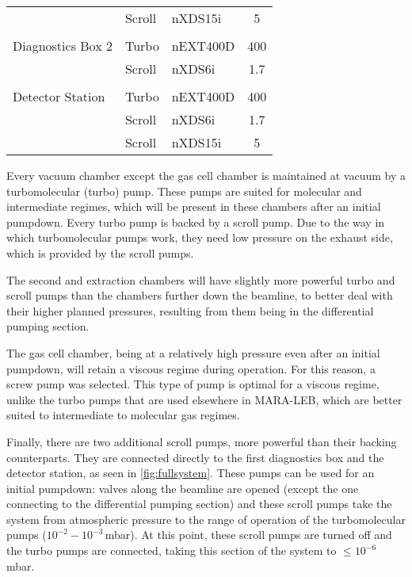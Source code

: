 \begin{table}[h!]
\begin{tabular}{@{}lllc@{}}
                        & Scroll    & nXDS15i       & 5     \\
                                                            \\
    Diagnostics Box 2   & Turbo     & nEXT400D      & 400   \\
                        & Scroll    & nXDS6i        & 1.7   \\
                                                            \\
    Detector Station    & Turbo     & nEXT400D      & 400   \\
                        & Scroll    & nXDS6i        & 1.7   \\
                        & Scroll    & nXDS15i       & 5     \\
    \hline
    \end{tabular}
 \end{table}

Every vacuum chamber except the gas cell chamber is maintained at vacuum by a turbomolecular (turbo) pump. These pumps are suited for molecular and intermediate regimes, which will be present in these chambers after an initial pumpdown. Every turbo pump is backed by a scroll pump. Due to the way in which turbomolecular pumps work, they need low pressure on the exhaust side, which is provided by the scroll pumps.

The second and extraction chambers will have slightly more powerful turbo and scroll pumps than the chambers further down the beamline, to better deal with their higher planned pressures, resulting from them being in the differential pumping section.

The gas cell chamber, being at a relatively high pressure even after an initial pumpdown, will retain a viscous regime during operation. For this reason, a screw pump was selected. This type of pump is optimal for a viscous regime, unlike the turbo pumps that are used elsewhere in MARA-LEB, which are better suited to intermediate to molecular gas regimes.

Finally, there are two additional scroll pumps, more powerful than their backing counterparts. They are connected directly to the first diagnostics box and the detector station, as seen in \autoref{fig:fullsystem}. These pumps can be used for an initial pumpdown: valves along the beamline are opened (except the one connecting to the differential pumping section) and these scroll pumps take the system from atmospheric pressure to the range of operation of the turbomolecular pumps ($10^{-2} - 10^{-3}\,$mbar). At this point, these scroll pumps are turned off and the turbo pumps are connected, taking this section of the system to $\leq10^{-6}\,$mbar. 

